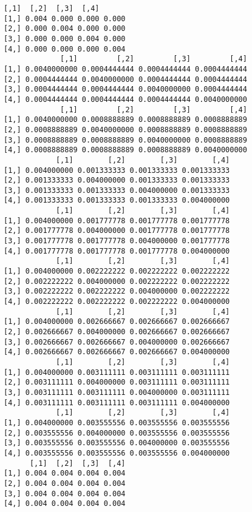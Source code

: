 \documentclass[11pt]{article}
\begin{document}
    \begin{Verbatim}[commandchars=\\\{\}]
      [,1]  [,2]  [,3]  [,4]
[1,] 0.004 0.000 0.000 0.000
[2,] 0.000 0.004 0.000 0.000
[3,] 0.000 0.000 0.004 0.000
[4,] 0.000 0.000 0.000 0.004
             [,1]         [,2]         [,3]         [,4]
[1,] 0.0040000000 0.0004444444 0.0004444444 0.0004444444
[2,] 0.0004444444 0.0040000000 0.0004444444 0.0004444444
[3,] 0.0004444444 0.0004444444 0.0040000000 0.0004444444
[4,] 0.0004444444 0.0004444444 0.0004444444 0.0040000000
             [,1]         [,2]         [,3]         [,4]
[1,] 0.0040000000 0.0008888889 0.0008888889 0.0008888889
[2,] 0.0008888889 0.0040000000 0.0008888889 0.0008888889
[3,] 0.0008888889 0.0008888889 0.0040000000 0.0008888889
[4,] 0.0008888889 0.0008888889 0.0008888889 0.0040000000
            [,1]        [,2]        [,3]        [,4]
[1,] 0.004000000 0.001333333 0.001333333 0.001333333
[2,] 0.001333333 0.004000000 0.001333333 0.001333333
[3,] 0.001333333 0.001333333 0.004000000 0.001333333
[4,] 0.001333333 0.001333333 0.001333333 0.004000000
            [,1]        [,2]        [,3]        [,4]
[1,] 0.004000000 0.001777778 0.001777778 0.001777778
[2,] 0.001777778 0.004000000 0.001777778 0.001777778
[3,] 0.001777778 0.001777778 0.004000000 0.001777778
[4,] 0.001777778 0.001777778 0.001777778 0.004000000
            [,1]        [,2]        [,3]        [,4]
[1,] 0.004000000 0.002222222 0.002222222 0.002222222
[2,] 0.002222222 0.004000000 0.002222222 0.002222222
[3,] 0.002222222 0.002222222 0.004000000 0.002222222
[4,] 0.002222222 0.002222222 0.002222222 0.004000000
            [,1]        [,2]        [,3]        [,4]
[1,] 0.004000000 0.002666667 0.002666667 0.002666667
[2,] 0.002666667 0.004000000 0.002666667 0.002666667
[3,] 0.002666667 0.002666667 0.004000000 0.002666667
[4,] 0.002666667 0.002666667 0.002666667 0.004000000
            [,1]        [,2]        [,3]        [,4]
[1,] 0.004000000 0.003111111 0.003111111 0.003111111
[2,] 0.003111111 0.004000000 0.003111111 0.003111111
[3,] 0.003111111 0.003111111 0.004000000 0.003111111
[4,] 0.003111111 0.003111111 0.003111111 0.004000000
            [,1]        [,2]        [,3]        [,4]
[1,] 0.004000000 0.003555556 0.003555556 0.003555556
[2,] 0.003555556 0.004000000 0.003555556 0.003555556
[3,] 0.003555556 0.003555556 0.004000000 0.003555556
[4,] 0.003555556 0.003555556 0.003555556 0.004000000
      [,1]  [,2]  [,3]  [,4]
[1,] 0.004 0.004 0.004 0.004
[2,] 0.004 0.004 0.004 0.004
[3,] 0.004 0.004 0.004 0.004
[4,] 0.004 0.004 0.004 0.004

    \end{Verbatim}
\end{document}
